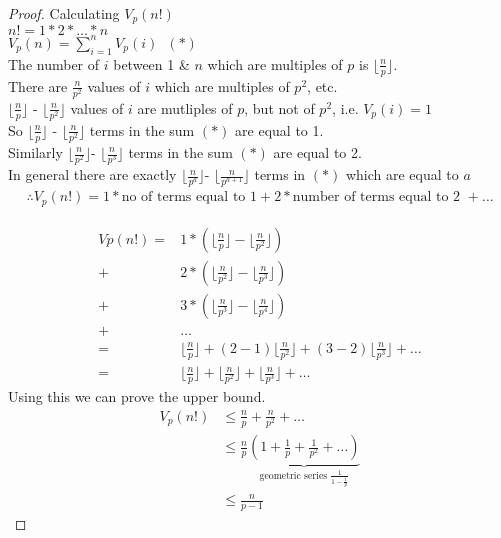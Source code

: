 \documentclass[11pt]{article}
\begin{document}
\begin{proof} Calculating $V_p(n!)$\\[1em]
	$n! = 1*2*\dots *n$\\
	$V_p(n) =\sum_{i=1}^n V_p(i) \hspace{7pt}(*)$\\[1em]
	The number of $i$ between 1 \& $ n $ which are multiples of $p$ is $\lfloor \frac{n}{p}\rfloor$.\\
	There are $\frac{n}{p^2}$ values of $i$ which are multiples of $p^2$, etc.\\[0.5em]
	$\lfloor \frac{n}{p}\rfloor$ - $\lfloor \frac{n}{p^2}\rfloor$ values of $i$ are mutliples of $p$, but not of $p^2$, i.e. $V_p(i) = 1$\\[0.5em]
	So   $\lfloor \frac{n}{p}\rfloor$ - $\lfloor \frac{n}{p^2}\rfloor$ terms in the sum $(*)$ are equal to 1.\\[0.5em]
	Similarly  $\lfloor \frac{n}{p^2}\rfloor$- $\lfloor \frac{n}{p^3}\rfloor$ terms in the sum $(*)$ are equal to 2.\\
	In general there are exactly $\lfloor \frac{n}{p^a}\rfloor$- $\lfloor \frac{n}{p^{a+1}}\rfloor$ terms in $(*)$ which are equal to $a$
	\begin{align*}
\therefore V_p(n!) = 1 * \text{no of terms equal to 1} + 2* \text{number of terms equal to 2 } + \dots 
	\end{align*}

	\begin{align*}
		Vp(n!) =& 1*(\lfloor \frac{n}{p}\rfloor - \lfloor \frac{n}{p^2}\rfloor)\\
		 + &2 *(\lfloor \frac{n}{p^2}\rfloor - \lfloor \frac{n}{p^3}\rfloor)\\
		 + &3 * (\lfloor \frac{n}{p^3}\rfloor - \lfloor \frac{n}{p^4}\rfloor)\\
		 +& \dots\\[1em]
		 =& \lfloor \frac{n}{p}\rfloor +  (2-1)\lfloor \frac{n}{p^2}\rfloor + (3-2)\lfloor \frac{n}{p^3}\rfloor + \dots \\[0.5em]
		 =&  \lfloor \frac{n}{p}\rfloor +  \lfloor \frac{n}{p^2}\rfloor +  \lfloor \frac{n}{p^3}\rfloor + \dots
	\end{align*}
	Using this we can prove the upper bound.
	\begin{align*}
		V_p(n!) &\leq \frac{n}{p} + \frac{n}{p^2} + \dots\\
			& \leq \frac{n}{p} \underbrace{(1+ \frac{1}{p} + \frac{1}{p^2} + \dots)}_{\text{geometric series } \frac{1}{1-\frac{1}{p}}}\\
			& \leq \frac{n}{p-1}
	\end{align*}
\end{proof} 
\end{document}
